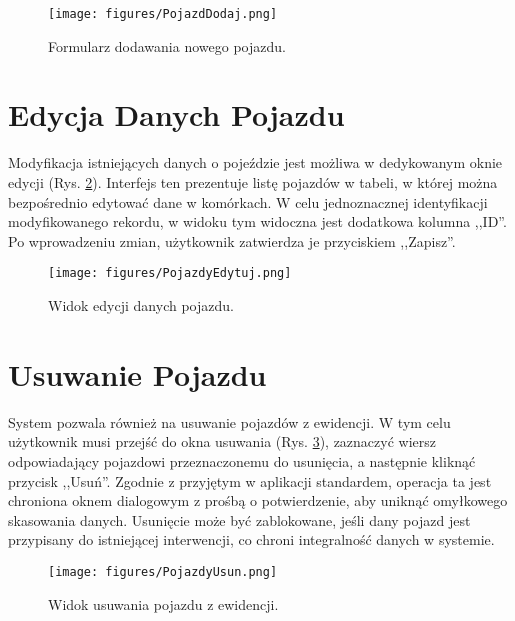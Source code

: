 \begin{figure}[H]
	\centering
	\texttt{[image: figures/PojazdDodaj.png]}
	\caption{Formularz dodawania nowego pojazdu.}
	\label{fig:pojazdy_dodaj_form}
\end{figure}

\section*{Edycja Danych Pojazdu}
\label{sec:pojazdy_edycja}

Modyfikacja istniejących danych o pojeździe jest możliwa w dedykowanym oknie edycji (Rys. \ref{fig:pojazdy_edycja_widok}). Interfejs ten prezentuje listę pojazdów w tabeli, w której można bezpośrednio edytować dane w komórkach. W celu jednoznacznej identyfikacji modyfikowanego rekordu, w widoku tym widoczna jest dodatkowa kolumna ,,ID''. Po wprowadzeniu zmian, użytkownik zatwierdza je przyciskiem ,,Zapisz''.

\begin{figure}[H]
    \centering
    \texttt{[image: figures/PojazdyEdytuj.png]}
    \caption{Widok edycji danych pojazdu.}
    \label{fig:pojazdy_edycja_widok}
\end{figure}

\section*{Usuwanie Pojazdu}
\label{sec:pojazdy_usuniecie}

System pozwala również na usuwanie pojazdów z ewidencji. W tym celu użytkownik musi przejść do okna usuwania (Rys. \ref{fig:pojazdy_usuniecie_widok}), zaznaczyć wiersz odpowiadający pojazdowi przeznaczonemu do usunięcia, a następnie kliknąć przycisk ,,Usuń''. Zgodnie z przyjętym w aplikacji standardem, operacja ta jest chroniona oknem dialogowym z prośbą o potwierdzenie, aby uniknąć omyłkowego skasowania danych. Usunięcie może być zablokowane, jeśli dany pojazd jest przypisany do istniejącej interwencji, co chroni integralność danych w systemie.

\begin{figure}[H]
    \centering
    \texttt{[image: figures/PojazdyUsun.png]}
    \caption{Widok usuwania pojazdu z ewidencji.}
    \label{fig:pojazdy_usuniecie_widok}
\end{figure}